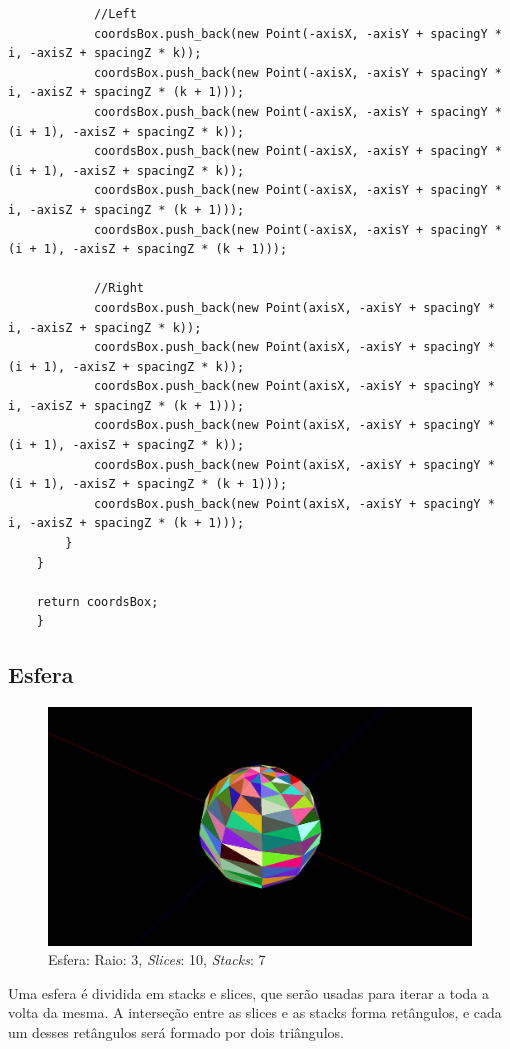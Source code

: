 \documentclass[a4paper]{article}
\begin{document}
\begin{lstlisting}
            //Left
            coordsBox.push_back(new Point(-axisX, -axisY + spacingY * i, -axisZ + spacingZ * k));
            coordsBox.push_back(new Point(-axisX, -axisY + spacingY * i, -axisZ + spacingZ * (k + 1)));
            coordsBox.push_back(new Point(-axisX, -axisY + spacingY * (i + 1), -axisZ + spacingZ * k));
            coordsBox.push_back(new Point(-axisX, -axisY + spacingY * (i + 1), -axisZ + spacingZ * k));
            coordsBox.push_back(new Point(-axisX, -axisY + spacingY * i, -axisZ + spacingZ * (k + 1)));
            coordsBox.push_back(new Point(-axisX, -axisY + spacingY * (i + 1), -axisZ + spacingZ * (k + 1)));

            //Right
            coordsBox.push_back(new Point(axisX, -axisY + spacingY * i, -axisZ + spacingZ * k));
            coordsBox.push_back(new Point(axisX, -axisY + spacingY * (i + 1), -axisZ + spacingZ * k));
            coordsBox.push_back(new Point(axisX, -axisY + spacingY * i, -axisZ + spacingZ * (k + 1)));
            coordsBox.push_back(new Point(axisX, -axisY + spacingY * (i + 1), -axisZ + spacingZ * k));
            coordsBox.push_back(new Point(axisX, -axisY + spacingY * (i + 1), -axisZ + spacingZ * (k + 1)));
            coordsBox.push_back(new Point(axisX, -axisY + spacingY * i, -axisZ + spacingZ * (k + 1)));
        }
    }

    return coordsBox;
    }
\end{lstlisting}
\subsection{Esfera}

\begin{figure}[H]
    \centering
    \includegraphics[width=0.5\linewidth]{sphere.png}
    \caption{Esfera: Raio: 3, \textit{Slices}: 10, \textit{Stacks}: 7}
\end{figure}

Uma esfera é dividida em stacks e slices, que serão usadas para iterar a toda a volta da mesma. A interseção entre as slices e as stacks forma retângulos, e cada um desses retângulos será formado por dois triângulos.
\end{document}

